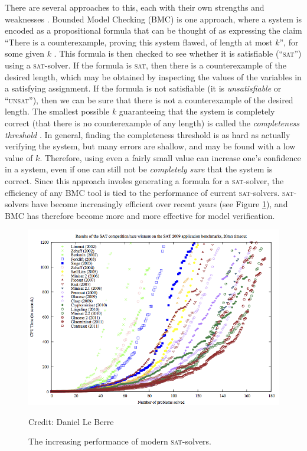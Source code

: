 \documentclass[proof,pdftex,11pt,a4]{article}
\newcommand{\credit}[1]{\par\hfill \footnotesize Credit: #1}
\newcommand{\sat}{\textsc{sat}}
\newcommand{\unsat}{\textsc{unsat}}
\begin{document}
There are several approaches to this, each with their own strengths and weaknesses \cite{Dsilva:2008}. Bounded Model Checking (BMC) is one approach, where a system is encoded as a propositional formula that can be thought of as expressing the claim ``There is a counterexample, proving this system flawed, of length at most $k$'', for some given $k$ \cite{Biere:1999}. This formula is then checked to see whether it is satisfiable (``\sat'') using a \sat{}-solver. If the formula is \sat, then there is a counterexample of the desired length, which may be obtained by inspecting the values of the variables in a satisfying assignment. If the formula is not satisfiable (it is \emph{unsatisfiable} or ``\unsat''), then we can be sure that there is not a counterexample of the desired length. The smallest possible $k$ guaranteeing that the system is completely correct (that there is no counterexample of any length) is called the \emph{completeness threshold} \cite{Kroening:2003}. In general, finding the completeness threshold is as hard as actually verifying the system, but many errors are shallow, and may be found with a low value of $k$. Therefore, using even a fairly small value can increase one's confidence in a system, even if one can still not be \emph{completely sure} that the system is correct. Since this approach involes generating a formula for a \sat{}-solver, the efficiency of any BMC tool is tied to the performance of current \sat{}-solvers. \sat{}-solvers have become increasingly efficient over recent years (see Figure \ref{fig:sat-solver-perf}), and BMC has therefore become more and more effective for model verification.

\begin{figure}[h]
  \includegraphics[width=\textwidth]{sat-perf}
  \credit{Daniel Le Berre}
  \caption{The increasing performance of modern \sat{}-solvers.}
  \label{fig:sat-solver-perf}
\end{figure}
\end{document}
